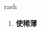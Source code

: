 
\begin{frame}
{\huge rash}
\begin{center}
\begin{enumerate}\Large
  \item \textbf{使稀薄}
\end{enumerate}
\end{center}
\end{frame}
